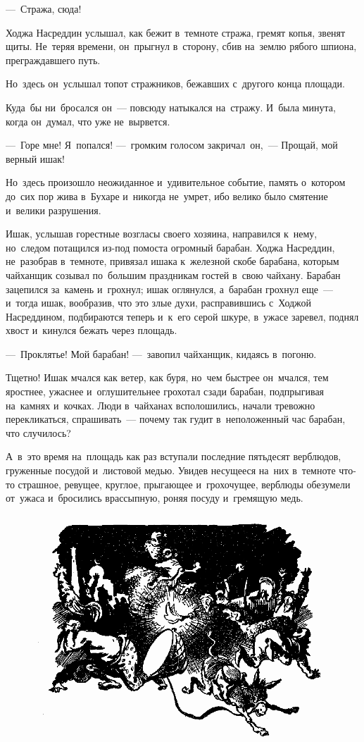 \documentclass[12pt,a4paper]{book}
\begin{document}
—~Стража, сюда!

Ходжа Насреддин услышал, как бежит в~темноте стража, гремят копья, звенят щиты. Не~теряя времени, он~прыгнул в~сторону, сбив на~землю рябого шпиона, преграждавшего путь.

Но~здесь он~услышал топот стражников, бежавших с~другого конца площади.

Куда~бы ни~бросался он~— повсюду натыкался на~стражу. И~была минута, когда он~думал, что уже не~вырвется.

—~Горе мне! Я~попался! —~громким голосом закричал~он,~— Прощай, мой верный ишак!

Но~здесь произошло неожиданное и~удивительное событие, память о~котором до~сих пор жива в~Бухаре и~никогда не~умрет, ибо велико было смятение и~велики разрушения.

Ишак, услышав горестные возгласы своего хозяина, направился к~нему, но~следом потащился из-под помоста огромный барабан. Ходжа Насреддин, не~разобрав в~темноте, привязал ишака к~железной скобе барабана, которым чайханщик созывал по~большим праздникам гостей в~свою чайхану. Барабан зацепился за~камень и~грохнул; ишак оглянулся, а~барабан грохнул еще~— и~тогда ишак, вообразив, что это злые духи, расправившись с~Ходжой Насреддином, подбираются теперь и~к~его серой шкуре, в~ужасе заревел, поднял хвост и~кинулся бежать через площадь.

—~Проклятье! Мой барабан! —~завопил чайханщик, кидаясь в~погоню.

Тщетно! Ишак мчался как ветер, как буря, но~чем быстрее он~мчался, тем яростнее, ужаснее и~оглушительнее грохотал сзади барабан, подпрыгивая на~камнях и~кочках. Люди в~чайханах всполошились, начали тревожно перекликаться, спрашивать~— почему так гудит в~неположенный час барабан, что случилось?

А~в~это время на~площадь как раз вступали последние пятьдесят верблюдов, груженные посудой и~листовой медью. Увидев несущееся на~них в~темноте что-то страшное, ревущее, круглое, прыгающее и~грохочущее, верблюды обезумели от~ужаса и~бросились врассыпную, роняя посуду и~гремящую медь.

\begin{figure}[h]
\centering
\includegraphics[width=\textwidth]{6.png}
\end{figure}
\end{document}
